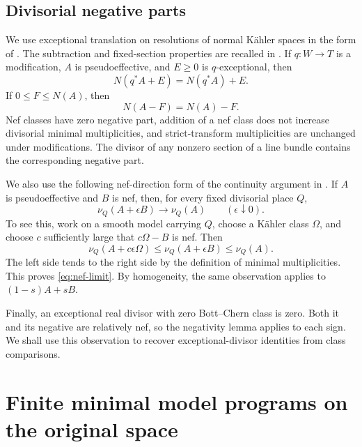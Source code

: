\documentclass[11pt,a4paper]{article}
\theoremstyle{definition}\newtheorem{definition}[theorem]{Definition}
\theoremstyle{remark}\newtheorem*{remark}{Remark}
\begin{document}
\subsection{Divisorial negative parts}

We use exceptional translation on resolutions of normal Kähler spaces
in the form of \cite[Lemma~2.3]{OAI034}. The subtraction and fixed-section
properties are recalled in \cite[Lemmas~2.2 and~2.5]{OAI034}.
If $q:W\to T$ is a modification, $A$ is pseudoeffective, and $E\ge0$
is $q$-exceptional, then
\begin{equation}\label{eq:exceptional}
 N(q^*A+E)=N(q^*A)+E.
\end{equation}
If $0\le F\le N(A)$, then
\begin{equation}\label{eq:subtract}
 N(A-F)=N(A)-F.
\end{equation}
Nef classes have zero negative part, addition of a nef class does not
increase divisorial minimal multiplicities, and strict-transform
multiplicities are unchanged under modifications. The divisor of any
nonzero section of a line bundle contains the corresponding negative part.

We also use the following nef-direction form of the continuity argument
in \cite[Lemma~3.7]{OAI034}. If $A$ is pseudoeffective and $B$ is nef,
then, for every
fixed divisorial place $Q$,
\begin{equation}\label{eq:nef-limit}
 \nu_Q(A+\epsilon B)\longrightarrow\nu_Q(A)
 \qquad(\epsilon\downarrow0).
\end{equation}
To see this, work on a smooth model carrying $Q$, choose a Kähler class
$\Omega$, and choose $c$ sufficiently large that $c\Omega-B$ is nef.
Then
\[
 \nu_Q(A+c\epsilon\Omega)
 \le\nu_Q(A+\epsilon B)\le\nu_Q(A).
\]
The left side tends to the right side by the definition of minimal
multiplicities. This proves \eqref{eq:nef-limit}. By homogeneity, the
same observation applies to $(1-s)A+sB$.

Finally, an exceptional real divisor with zero Bott--Chern class is
zero. Both it and its negative are relatively nef, so the negativity
lemma applies to each sign. We shall use this observation to recover
exceptional-divisor identities from class comparisons.

\section{Finite minimal model programs on the original space}
\label{sec:finite-program}
\end{document}
